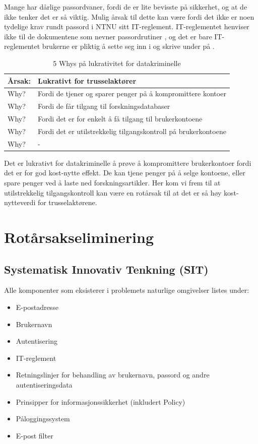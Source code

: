 Mange har dårlige passordvaner, fordi de er lite bevisste på sikkerhet, og at de ikke tenker det er så viktig. Mulig årsak til dette kan være fordi det ikke er noen tydelige krav rundt passord i NTNU sitt IT-reglement. IT-reglementet henviser ikke til de dokumentene som nevner passordrutiner \cite{ITReg}, og det er bare IT-reglementet brukerne er pliktig å sette seg inn i og skrive under på \cite{}. 

\begin{table} [H]
    \centering
    \begin{tabular}{ | m{5em} | m{30em} | }
        \hline
            \cellcolor{yellow} Årsak: & \cellcolor{yellow} Lukrativt for trusselaktører \\
        \hline
            Why? & Fordi de tjener og sparer penger på å kompromittere kontoer \\
        \hline
            Why? & Fordi de får tilgang til forskningsdatabaser \\
        \hline
            Why? & Fordi det er for enkelt å få tilgang til brukerkontoene \\
        \hline
            Why? & Fordi det er utilstrekkelig tilgangskontroll på brukerkontoene \\
        \hline
            Why? & - \\
        \hline
    \end{tabular}
    \caption[5 Whys: Lukrativt for datakriminelle]{5 Whys på lukrativitet for datakriminelle}
    \label{5Whys-passordvaner}
\end{table}

Det er lukrativt for datakriminelle å prøve å kompromittere brukerkontoer fordi det er for god kost-nytte effekt. De kan tjene penger på å selge kontoene, eller spare penger ved å laste ned forskningsartikler. Her kom vi frem til at utilstrekkelig tilgangskontroll kan være en rotårsak til at det er så høy kost-nytteverdi for trusselaktørene.

\section{Rotårsakseliminering}

\subsection{Systematisk Innovativ Tenkning (SIT)}
Alle komponenter som eksisterer i problemets naturlige omgivelser listes under:

\begin{itemize}
    \item E-postadresse
    \item Brukernavn
    \item Autentisering
    \item IT-reglement
    \item Retningslinjer for behandling av brukernavn, passord og andre autentiseringsdata
    \item Prinsipper for informasjonssikkerhet (inkludert Policy)
    \item Påloggingssystem
    \item E-post filter
\end{itemize}

